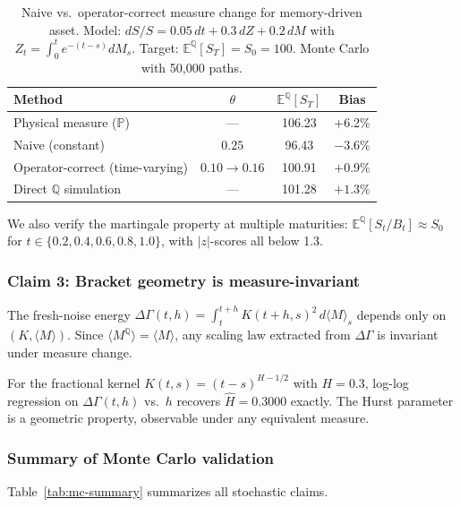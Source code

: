 \documentclass[11pt]{article}
\theoremstyle{plain}
\theoremstyle{definition}
\theoremstyle{remark}
\newcommand{\E}{\mathbb{E}}
\newcommand{\PP}{\mathbb{P}}
\newcommand{\QQ}{\mathbb{Q}}
\newcommand{\dGamma}{\Delta\Gamma}
\newcommand{\bracket}[1]{\langle #1 \rangle}
\begin{document}
\begin{table}[h]
\centering
\caption{Naive vs.\ operator-correct measure change for memory-driven asset.
Model: $dS/S = 0.05\,dt + 0.3\,dZ + 0.2\,dM$ with $Z_t = \int_0^t e^{-(t-s)}dM_s$.
Target: $\E^{\QQ}[S_T] = S_0 = 100$. Monte Carlo with 50{,}000 paths.}
\label{tab:naive-vs-operator}
\begin{tabular}{lccc}
\hline
\textbf{Method} & \textbf{$\theta$} & $\E^{\QQ}[S_T]$ & \textbf{Bias} \\
\hline
Physical measure ($\PP$) & --- & 106.23 & +6.2\% \\
Naive (constant) & $0.25$ & 96.43 & $-3.6\%$ \\
Operator-correct (time-varying) & $0.10 \to 0.16$ & 100.91 & $+0.9\%$ \\
Direct $\QQ$ simulation & --- & 101.28 & $+1.3\%$ \\
\hline
\end{tabular}
\end{table}

We also verify the martingale property at multiple maturities:
$\E^{\QQ}[S_t/B_t] \approx S_0$ for $t \in \{0.2, 0.4, 0.6, 0.8, 1.0\}$,
with $|z|$-scores all below 1.3.

\subsubsection{Claim 3: Bracket geometry is measure-invariant}

The fresh-noise energy $\dGamma(t,h) = \int_t^{t+h} K(t+h,s)^2\,d\bracket{M}_s$
depends only on $(K, \bracket{M})$. Since $\bracket{M^{\QQ}} = \bracket{M}$,
any scaling law extracted from $\dGamma$ is invariant under measure change.

For the fractional kernel $K(t,s) = (t-s)^{H-1/2}$ with $H = 0.3$, log-log
regression on $\dGamma(t,h)$ vs.\ $h$ recovers $\hat{H} = 0.3000$ exactly.
The Hurst parameter is a geometric property, observable under any equivalent
measure.

\subsubsection{Summary of Monte Carlo validation}

Table~\ref{tab:mc-summary} summarizes all stochastic claims.
\end{document}
